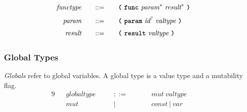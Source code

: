 \begin{alignat*}{9}
    && \textit{functype}    &&\quad ::= &\quad && \textbf{\texttt{(}}\ \textbf{\texttt{func}}\ \textit{param}^*\ \textit{result}^*\ \textbf{\texttt{)}}\  \quad && \\[1mm]
    && \textit{param}    &&\quad ::= &\quad && \textbf{\texttt{(}}\ \textbf{\texttt{param}}\ \textit{id}^?\ \textit{valtype}\ \textbf{\texttt{)}}\  \quad && \\[1mm]
    && \textit{result}    &&\quad ::= &\quad && \textbf{\texttt{(}}\ \textbf{\texttt{result}}\ \textit{valtype}\ \textbf{\texttt{)}}\  \quad && \\[1mm]
\end{alignat*}

\subsubsection{Global Types}
\textit{Globals} refer to global variables. A global type is a value type and a mutability flag.
\begin{alignat*}{9}
    && \textit{globaltype}    &&\quad ::= &\quad && \textit{mut}\ \textit{valtype}  \quad && \\[1mm]
    && \textit{mut} &&\quad | &\quad && \textit{const}\ |\ \textit{var} \quad && \\[1mm]
\end{alignat*}
